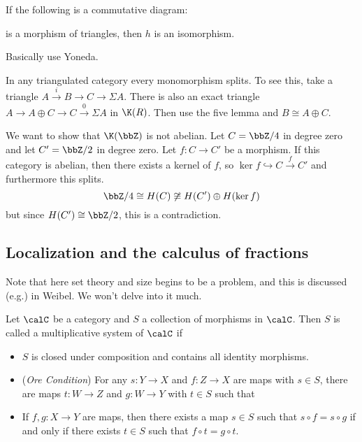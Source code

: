 \documentclass[12pt]{article}
\begin{document}
\begin{prop}
	If the following is a commutative diagram:
	\begin{center}
	\end{center}
	is a morphism of triangles, then $h$ is an isomorphism.
\end{prop}
\begin{prf}
	Basically use Yoneda.
\end{prf}

\begin{rmk}
	In any triangulated category every monomorphism splits. To see this, take a triangle $A\xrightarrow{i}B\to C\to\Sigma A$.
	There is also an exact triangle $A\to A\oplus C\to C\xrightarrow{0}\Sigma A$ in $\K(R)$. Then use the five lemma and $B\cong A\oplus C$.
\end{rmk}
\begin{ex}
	We want to show that $\K(\bbZ)$ is not abelian. Let $C=\bbZ/4$ in degree zero and let $C'=\bbZ/2$ in degree zero. Let 
	$f:C\to C'$ be a morphism. If this category is abelian, then there exists a kernel of $f$, 
	so $\ker f\hookrightarrow C\xrightarrow{f}C'$ and furthermore this splits. 
	\[\bbZ/4\cong H(C)\not\cong H(C')\oplus H(\ker f)\] 
	but since $H(C')\cong\bbZ/2$, this is a contradiction.
\end{ex}
\subsection{Localization and the calculus of fractions}
Note that here set theory and size begins to be a problem, and this is discussed (e.g.) in Weibel. We 
won't delve into it much.
\begin{defn}
	Let $\calC$ be a category and $S$ a collection of morphisms in $\calC$. Then $S$ is called a multiplicative system of $\calC$ if 
	\begin{itemize}
		\item $S$ is closed under composition and contains all identity morphisms.
		\item (\textit{Ore Condition}) For any $s:Y\to X$ and $f:Z\to X$ are maps with $s\in S$,
		there are maps $t:W\to Z$ and $g:W\to Y$ with $t\in S$ such that 
		\begin{center}
		\end{center}
		\item If $f,g:X\to Y$ are maps, then there exists a map $s\in S$ such that $s\circ f=s\circ g$ if 
		and only if there exists $t\in S$ such that $f\circ t=g\circ t$.
	\end{itemize}
\end{defn}
\end{document}

